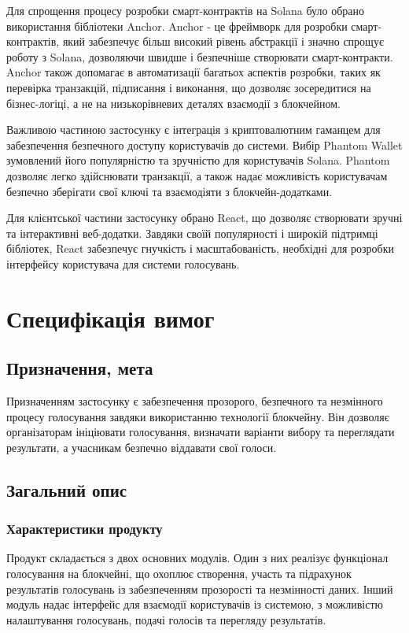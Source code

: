 \documentclass[14pt]{extreport}
\begin{document}
  Для спрощення процесу розробки смарт-контрактів на Solana було обрано використання бібліотеки Anchor. Anchor - це фреймворк для розробки смарт-контрактів, який забезпечує більш високий рівень абстракції і значно спрощує роботу з Solana, дозволяючи швидше і безпечніше створювати смарт-контракти. Anchor також допомагає в автоматизації багатьох аспектів розробки, таких як перевірка транзакцій, підписання і виконання, що дозволяє зосередитися на бізнес-логіці, а не на низькорівневих деталях взаємодії з блокчейном.

  Важливою частиною застосунку є інтеграція з криптовалютним гаманцем для забезпечення безпечного доступу користувачів до системи. Вибір Phantom Wallet зумовлений його популярністю та зручністю для користувачів Solana. Phantom дозволяє легко здійснювати транзакції, а також надає можливість користувачам безпечно зберігати свої ключі та взаємодіяти з блокчейн-додатками.

  Для клієнтської частини застосунку обрано React, що дозволяє створювати зручні та інтерактивні веб-додатки. Завдяки своїй популярності і широкій підтримці бібліотек, React забезпечує гнучкість і масштабованість, необхідні для розробки інтерфейсу користувача для системи голосувань.
  
  \section{Специфікація вимог}
  \subsection{Призначення, мета}
  
  Призначенням застосунку є забезпечення прозорого, безпечного та незмінного процесу голосування завдяки використанню технології блокчейну. Він дозволяє організаторам ініціювати голосування, визначати варіанти вибору та переглядати результати, а учасникам безпечно віддавати свої голоси.
  
  
  \subsection{Загальний опис}
  \subsubsection{Характеристики продукту}  
  Продукт складається з двох основних модулів. Один з них реалізує функціонал голосування на блокчейні, що охоплює створення, участь та підрахунок результатів голосувань із забезпеченням прозорості та незмінності даних. Інший модуль надає інтерфейс для взаємодії користувачів із системою, з можливістю налаштування голосувань, подачі голосів та перегляду результатів.
  
\end{document}
